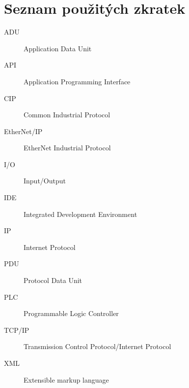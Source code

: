 \chapter{Seznam použitých zkratek}
\begin{description}
	\item[ADU] Application Data Unit
	\item[API] Application Programming Interface 
	\item[CIP] Common Industrial Protocol
	\item[EtherNet/IP] EtherNet Industrial Protocol
	\item[I/O] Input/Output
	\item[IDE] Integrated Development Environment 
	\item[IP] Internet Protocol 
	\item[PDU] Protocol Data Unit 
	\item[PLC] Programmable Logic Controller
	\item[TCP/IP] Transmission Control Protocol/Internet Protocol 
	\item[XML] Extensible markup language
\end{description}
